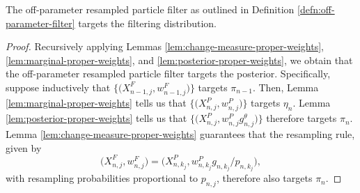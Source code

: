     


\begin{thm}
    \label{thm:off-parameter-targeting}
    The off-parameter resampled particle filter as outlined in Definition \ref{defn:off-parameter-filter} targets the filtering distribution.
\end{thm}
\begin{proof}
    Recursively applying Lemmas \ref{lem:change-measure-proper-weights}, \ref{lem:marginal-proper-weights}, and \ref{lem:posterior-proper-weights}, we obtain that the off-parameter resampled particle filter targets the posterior.
    Specifically, suppose inductively that $\big\{\big(X^{F}_{n-1,j},w^{F}_{n-1,j}\big)\big\}$ targets $\pi_{n-1}$.
    Then, Lemma \ref{lem:marginal-proper-weights} tells us that $\big\{\big(X^{P}_{n,j},w^{P}_{n,j}\big)\big\}$ targets $\eta_n$.
    Lemma \ref{lem:posterior-proper-weights} tells us that $\big\{\big(X^{P}_{n,j},w^{P}_{n,j} g^\theta_{n,j} \big)\big\}$ therefore targets  $\pi_n$.
    Lemma \ref{lem:change-measure-proper-weights} guarantees that the resampling rule, given by 
    \begin{equation}
    \big(X^{F}_{n,j},w^{F}_{n,j}\big) = \big(X^{P}_{n,k_j}, w^{P}_{n,k_j} g_{n,k_j}\big/ p_{n,k_j}\big),
    \end{equation}
    with resampling probabilities proportional to $p_{n,j}$, therefore also targets $\pi_n$.
\end{proof}

